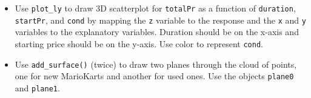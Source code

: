 \documentclass[]{book}
\newenvironment{Shaded}{\begin{snugshade}}{\end{snugshade}}
\newcommand{\KeywordTok}[1]{\textcolor[rgb]{0.13,0.29,0.53}{\textbf{#1}}}
\newcommand{\DataTypeTok}[1]{\textcolor[rgb]{0.13,0.29,0.53}{#1}}
\newcommand{\FloatTok}[1]{\textcolor[rgb]{0.00,0.00,0.81}{#1}}
\newcommand{\StringTok}[1]{\textcolor[rgb]{0.31,0.60,0.02}{#1}}
\newcommand{\CommentTok}[1]{\textcolor[rgb]{0.56,0.35,0.01}{\textit{#1}}}
\newcommand{\OtherTok}[1]{\textcolor[rgb]{0.56,0.35,0.01}{#1}}
\newcommand{\OperatorTok}[1]{\textcolor[rgb]{0.81,0.36,0.00}{\textbf{#1}}}
\newcommand{\NormalTok}[1]{#1}
\providecommand{\tightlist}{%
  \setlength{\itemsep}{0pt}\setlength{\parskip}{0pt}}
\begin{document}
\begin{itemize}
\tightlist
\item
  Use \texttt{plot\_ly} to draw 3D scatterplot for \texttt{totalPr} as a
  function of \texttt{duration}, \texttt{startPr}, and \texttt{cond} by
  mapping the \texttt{z} variable to the response and the \texttt{x} and
  \texttt{y} variables to the explanatory variables. Duration should be
  on the x-axis and starting price should be on the y-axis. Use color to
  represent \texttt{cond}.
\end{itemize}

\begin{Shaded}
\end{Shaded}

\hypertarget{htmlwidget-358eeb0b2e917045f18e}{}

\begin{itemize}
\tightlist
\item
  Use \texttt{add\_surface()} (twice) to draw two planes through the
  cloud of points, one for new MarioKarts and another for used ones. Use
  the objects \texttt{plane0} and \texttt{plane1}.
\end{itemize}

\begin{Shaded}
\end{Shaded}
\end{document}
